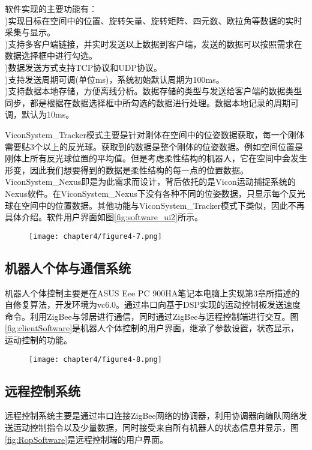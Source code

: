 软件实现的主要功能有：\\
)实现目标在空间中的位置、旋转矢量、旋转矩阵、四元数、欧拉角等数据的实时采集与显示。\\
)支持多客户端链接，并实时发送以上数据到客户端，发送的数据可以按照需求在数据选择框中进行勾选。\\
)数据发送方式支持TCP协议和UDP协议。\\
)支持发送周期可调(单位ms)，系统初始默认周期为100ms。\\
)支持数据本地存储，方便离线分析。数据存储的类型与发送给客户端的数据类型同步，都是根据在数据选择框中所勾选的数据进行处理。数据本地记录的周期可调，默认为10ms。

ViconSystem\_Tracker模式主要是针对刚体在空间中的位姿数据获取，每一个刚体需要贴3个以上的反光球。获取到的数据是整个刚体的位姿数据。例如空间位置是刚体上所有反光球位置的平均值。但是考虑柔性结构的机器人，它在空间中会发生形变，因此我们想要得到的数据是柔性结构的每一点的位置数据。ViconSystem\_Nexus即是为此需求而设计，背后依托的是Vicon运动捕捉系统的Nexus软件。在ViconSystem\_Nexus下没有各种不同的位姿数据，只显示每个反光球在空间中的位置数据。其他功能与ViconSystem\_Tracker模式下类似，因此不再具体介绍。软件用户界面如图\ref{fig:software_ui2}所示。
\begin{figure}[!htbp]
	\centering
	\texttt{[image: chapter4/figure4-7.png]}
\end{figure}

\subsection{机器人个体与通信系统}
机器人个体控制主要是在ASUS Eee PC 900HA笔记本电脑上实现第3章所描述的自修复算法，开发环境为vc6.0。通过串口向基于DSP实现的运动控制板发送速度命令。利用ZigBee与邻居进行通信，同时通过ZigBee与远程控制端进行交互。图\ref{fig:clientSoftware}是机器人个体控制的用户界面，继承了参数设置，状态显示，运动控制的功能。

\begin{figure}[!htbp]
	\centering
	\texttt{[image: chapter4/figure4-8.png]}
\end{figure}

\subsection{远程控制系统}
远程控制系统主要是通过串口连接ZigBee网络的协调器，利用协调器向编队网络发送运动控制指令以及少量数据，同时接受来自所有机器人的状态信息并显示，图\ref{fig:RopSoftware}是远程控制端的用户界面。

